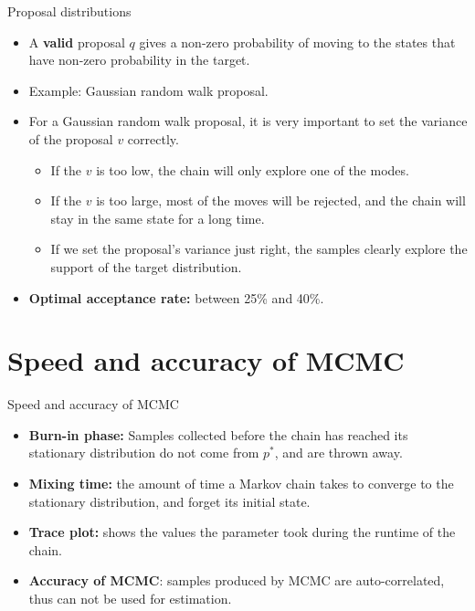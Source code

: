 \documentclass[10pt,mathserif]{beamer}
\begin{document}
\begin{frame}{Proposal distributions}
\begin{itemize}
    \item A \textbf{valid} proposal $q$ gives a non-zero probability of moving to the states that have non-zero probability in the target.
    \item Example: Gaussian random walk proposal.
    \item For a Gaussian random walk proposal, it is very important to set the variance of the proposal $v$ correctly.
    \begin{itemize}
        \item If the $v$ is too low, the chain will only explore one of the modes.
        \item If the $v$ is too large, most of the moves will be rejected, and the chain will stay in the same state for a long time. 
        \item If we set the proposal's variance just right, the samples clearly explore the support of the target distribution.
    \end{itemize}
    \item \textbf{Optimal acceptance rate:} between 25\% and 40\%.
\end{itemize}
\end{frame}

\section{Speed and accuracy of MCMC}
\begin{frame}{Speed and accuracy of MCMC}
\begin{itemize}
    \item \textbf{Burn-in phase:} Samples collected before the chain has reached its stationary distribution do not come from $p^*$, and are thrown away.
    \item \textbf{Mixing time:} the amount of time a Markov chain takes to converge to the stationary distribution, and forget its initial state.
    \item \textbf{Trace plot:} shows the values the parameter took during the runtime of the chain.
    \item \textbf{Accuracy of MCMC}: samples produced by MCMC are auto-correlated, thus can not be used for estimation.
\end{itemize}
\end{frame}
\end{document}
